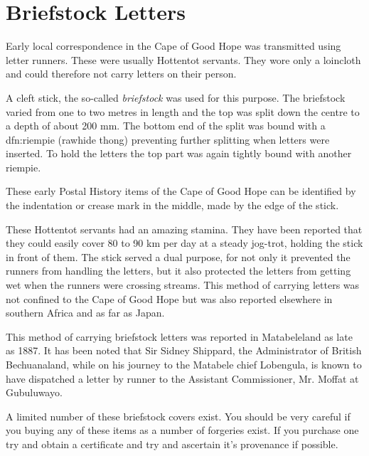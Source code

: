 \section{Briefstock Letters}

 
Early local correspondence in the Cape of Good Hope was transmitted 
using letter runners. 
These were usually Hottentot servants. 
They wore only a loincloth and could therefore not carry letters 
on their person. 


A cleft stick, the so-called \textit{briefstock}  was used for this purpose. 
The briefstock varied from one to two metres in length and the top 
was split down the centre to a depth of about 200 mm. The bottom end 
of the split was bound 
with a {{dfn:riempie}} (rawhide thong) preventing further splitting 
when letters were inserted. To hold the letters the top part was 
again tightly bound with another riempie.

These early Postal History items of the Cape of Good Hope can be 
identified by the indentation
or crease mark in the middle, made by the edge of the stick.
 
These Hottentot servants had an amazing stamina. They have been 
reported that they could easily cover 80 to 90 km per day at a 
steady jog-trot, holding the stick in front of them. The stick served 
a dual purpose, for not only it prevented the runners from handling 
the letters, but it also protected the letters from getting wet 
when the runners were crossing streams. This method of carrying 
letters was not confined to the Cape of Good Hope but was also 
reported elsewhere in southern Africa and as far as Japan.

This method of carrying briefstock letters was reported in Matabeleland 
as late as 1887. It has been noted that Sir Sidney Shippard, the 
Administrator of British Bechuanaland, while on his journey to 
the Matabele chief Lobengula, is known to have dispatched a 
letter by runner to the Assistant Commissioner, Mr. Moffat at Gubuluwayo.

A limited number of these briefstock covers exist. You should be very careful 
if you buying any of these items as a number of forgeries exist. 
If you purchase one try 
and obtain a certificate and try and ascertain it's provenance if possible.

                                  